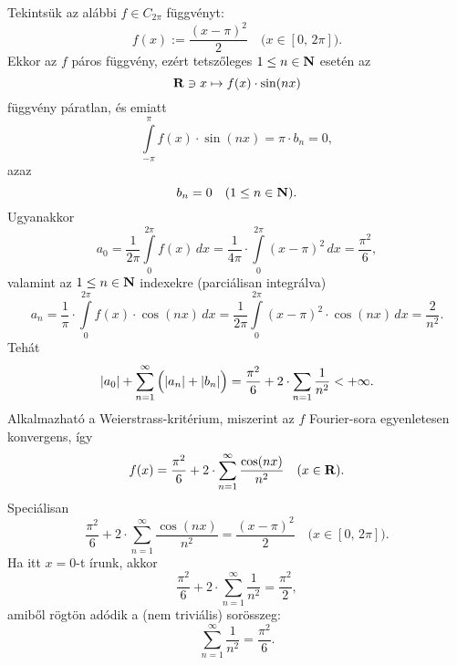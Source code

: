 Tekintsük az alábbi $f \in C_{2\pi}$ függvényt:
\[
	f(x) := \frac{(x-\pi)^2}{2} \quad \big(x \in [0, \, 2\pi]\big).
\]
Ekkor az $f$ páros függvény, ezért tetszőleges $1 \leq n \in \mathbf{N}$ esetén az
\[
	\mathbf{R} \ni x \mapsto f(x) \cdot \sin(nx)
\]
függvény páratlan, és emiatt
\[
	\int\limits_{-\pi}^\pi f(x) \cdot \sin(nx) = \pi \cdot b_n = 0,
\]
azaz
\[
	b_n = 0 \quad (1 \leq n \in \mathbf{N}).
\]
Ugyanakkor
\[
	a_0 = \frac{1}{2\pi} \int\limits_0^{2\pi} f(x) \, dx = \frac{1}{4\pi} \cdot \int\limits_0^{2\pi} (x - \pi)^2 \, dx = \frac{\pi^2}{6},
\]
valamint az $1 \leq n \in \mathbf{N}$ indexekre (parciálisan integrálva)
\[
	a_n = \frac{1}{\pi} \cdot \int\limits_0^{2\pi} f(x) \cdot \cos(nx) \, dx = \frac{1}{2\pi} \int\limits_0^{2\pi} (x-\pi)^2 \cdot \cos(nx) \, dx = \frac{2}{n^2}.
\]
Tehát
\[
	|a_0| + \sum_{n=1}^\infty \Big(  |a_n| + |b_n|  \Big) = \frac{\pi^2}{6} + 2 \cdot \sum_{n=1} \frac{1}{n^2} < + \infty.
\]
Alkalmazható a Weierstrass-kritérium, miszerint az $f$ Fourier-sora egyenletesen konvergens, így
\[
	f(x) = \frac{\pi^2}{6} + 2 \cdot \sum_{n=1}^\infty \frac{\cos(nx)}{n^2} \quad (x \in \mathbf{R}).
\]
Speciálisan
\[
	\frac{\pi^2}{6} + 2 \cdot \sum_{n=1}^\infty \frac{\cos(nx)}{n^2} = \frac{(x-\pi)^2}{2} \quad \big(x \in [0, \, 2\pi]\big).
\]
Ha itt $x = 0$-t írunk, akkor
\[
	\frac{\pi^2}{6} + 2 \cdot \sum_{n=1}^\infty \frac{1}{n^2} = \frac{\pi^2}{2},
\]
amiből rögtön adódik a (nem triviális) sorösszeg:
\[
	\sum_{n=1}^\infty \frac{1}{n^2} = \frac{\pi^2}{6}.
\]